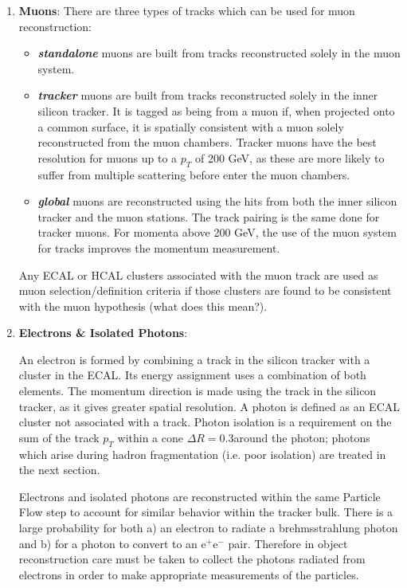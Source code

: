 \begin{enumerate}
\item \textbf{Muons}:
There are three types of tracks which can be used for muon reconstruction:
\begin{itemize}
\item
\textit{\textbf{standalone}} muons are built from tracks reconstructed solely in the muon system.
\item
\textit{\textbf{tracker}} muons are built from tracks reconstructed solely in the inner silicon tracker. It is tagged as being from a muon if, when projected onto a common surface, it is spatially consistent with a muon solely reconstructed from the muon chambers. Tracker muons have the best resolution for muons up to a $p_{T}$ of 200 GeV, as these are more likely to suffer from multiple scattering before enter the muon chambers.
\item
\textit{\textbf{global}} muons are reconstructed using the hits from both the inner silicon tracker and the muon stations.  The track pairing is the same done for tracker muons. For momenta above 200 GeV, the use of the muon system for tracks improves the momentum measurement.
\end{itemize}

Any ECAL or HCAL clusters associated with the muon track are used as muon selection/definition criteria if those clusters are found to be consistent with the muon hypothesis (what does this mean?).

\item \textbf{Electrons \& Isolated Photons}:

An electron is formed by combining a track in the silicon tracker with a cluster in the ECAL. Its energy assignment uses a combination of both elements. The momentum direction is made using the track in the silicon tracker, as it gives greater spatial resolution.  A photon is defined as an ECAL cluster not associated with a track. Photon isolation is a requirement on the sum of the track $p_{T}$ within a cone $\Delta R = 0.3$around the photon; photons which arise during hadron fragmentation (i.e. poor isolation) are treated in the next section. 

Electrons and isolated photons are reconstructed within the same Particle Flow step to account for similar behavior within the tracker bulk. There is a large probability for both a) an electron to radiate a brehmsstrahlung photon and b) for a photon to convert to an e$^{+}$e$^{-}$ pair. Therefore in object reconstruction care must be taken to collect the photons radiated from electrons in order to make appropriate measurements of the particles.


\end{enumerate}
